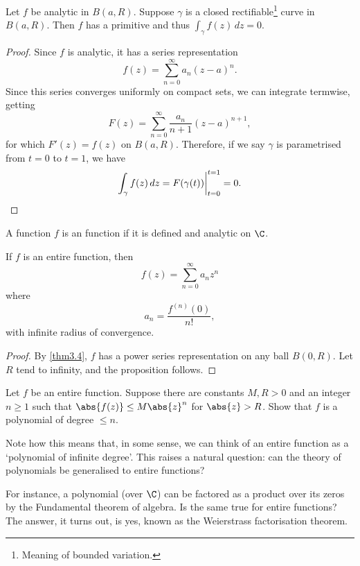 \begin{theorem}\label{thm3.7}
	Let $f$ be analytic in $B(a, R)$.
	Suppose $\gamma$ is a closed rectifiable\footnote{Meaning of bounded variation.} curve in $B(a, R)$.
	Then $f$ has a primitive and thus $\displaystyle \int_\gamma f(z) \, d z = 0$.
\end{theorem}

\begin{proof}
	Since $f$ is analytic, it has a series representation
	\[
		f(z) = \sum_{n = 0}^\infty a_n (z - a)^n.
	\]
	Since this series converges uniformly on compact sets, we can integrate termwise, getting
	\[
		F(z) = \sum_{n = 0}^\infty \frac{a_n}{n + 1} (z - a)^{n + 1},
	\]
	for which $F'(z) = f(z)$ on $B(a, R)$.
	Therefore, if we say $\gamma$ is parametrised from $t = 0$ to $t = 1$, we have
	\[
		\int_\gamma f(z) \, d z = F(\gamma(t)) \biggr\rvert_{t = 0}^{t = 1} = 0. \qedhere
	\]
\end{proof}

\begin{definition}
	A function $f$ is an  function if it is defined and analytic on $\C$.
\end{definition}

\begin{proposition}\label{prop3.8}
	If $f$ is an entire function, then
	\[
		f(z) = \sum_{n = 0}^\infty a_n z^n
	\]
	where
	\[
		a_n = \frac{f^{(n)}(0)}{n!},
	\]
	with infinite radius of convergence.
\end{proposition}

\begin{proof}
	By \autoref{thm3.4}, $f$ has a power series representation on any ball $B(0, R)$.
	Let $R$ tend to infinity, and the proposition follows.
\end{proof}

\begin{exercise}\label{ex:polynomial}
	Let $f$ be an entire function.
	Suppose there are constants $M, R > 0$ and an integer $n \geq 1$ such that $\abs{f(z)} \leq M \abs{z}^n$ for $\abs{z} > R$.
	Show that $f$ is a polynomial of degree $\leq n$.
\end{exercise}

\label{entirequestions}
Note how this means that, in some sense, we can think of an entire function as a `polynomial of infinite degree'.
This raises a natural question: can the theory of polynomials be generalised to entire functions?

For instance, a polynomial (over $\C$) can be factored as a product over its zeros by the Fundamental theorem of algebra.
Is the same true for entire functions?
The answer, it turns out, is yes, known as the Weierstrass factorisation theorem.

